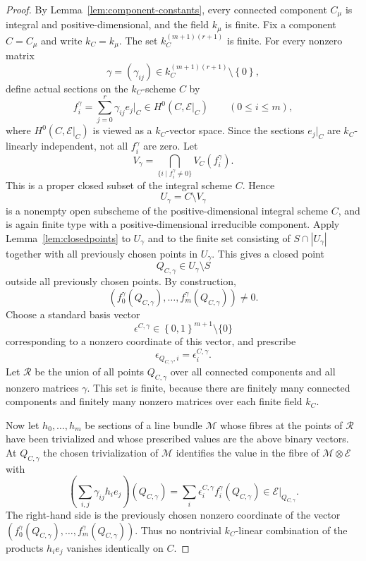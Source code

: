 \documentclass{lms}
\newcommand{\MM}{\mathcal M}
\newcommand{\EE}{\mathcal E}
\newcommand{\set}[1]{\left\{#1\right\}}
\begin{document}
\begin{proof}
By Lemma~\ref{lem:component-constants}, every connected component $C_\mu$ is integral and positive-dimensional, and the field $k_\mu$ is finite.  Fix a component $C=C_\mu$ and write $k_C=k_\mu$.  The set $k_C^{(m+1)(r+1)}$ is finite.  For every nonzero matrix
\[
        \gamma=(\gamma_{ij})\in k_C^{(m+1)(r+1)}\setminus\set{0},
\]
define actual sections on the $k_C$-scheme $C$ by
\[
        f_i^\gamma=\sum_{j=0}^{r}\gamma_{ij}e_j|_C
        \in H^0(C,\EE|_C)
        \qquad(0\le i\le m),
\]
where $H^0(C,\EE|_C)$ is viewed as a $k_C$-vector space.  Since the sections $e_j|_C$ are $k_C$-linearly independent, not all $f_i^\gamma$ are zero.  Let
\[
        V_\gamma=\bigcap_{\{i\mid f_i^\gamma\ne0\}}V_C(f_i^\gamma).
\]
This is a proper closed subset of the integral scheme $C$.  Hence
\[
        U_\gamma=C\setminus V_\gamma
\]
is a nonempty open subscheme of the positive-dimensional integral scheme $C$, and is again finite type with a positive-dimensional irreducible component.  Apply Lemma~\ref{lem:closedpoints} to $U_\gamma$ and to the finite set consisting of $S\cap |U_\gamma|$ together with all previously chosen points in $U_\gamma$.  This gives a closed point
\[
        Q_{C,\gamma}\in U_\gamma\setminus S
\]
outside all previously chosen points.  By construction,
\[
        (f_0^\gamma(Q_{C,\gamma}),\ldots,f_m^\gamma(Q_{C,\gamma}))
        \ne0.
\]
Choose a standard basis vector
\[
        \epsilon^{C,\gamma}\in\set{0,1}^{m+1}\setminus\{0\}
\]
corresponding to a nonzero coordinate of this vector, and prescribe
\[
        \epsilon_{Q_{C,\gamma},i}=\epsilon_i^{C,\gamma}.
\]
Let $\mathcal R$ be the union of all points $Q_{C,\gamma}$ over all connected components and all nonzero matrices $\gamma$.  This set is finite, because there are finitely many connected components and finitely many nonzero matrices over each finite field $k_C$.

Now let $h_0,\ldots,h_m$ be sections of a line bundle $\MM$ whose fibres at the points of $\mathcal R$ have been trivialized and whose prescribed values are the above binary vectors.  At $Q_{C,\gamma}$ the chosen trivialization of $\MM$ identifies the value in the fibre of $\MM\otimes\EE$ with
\[
        \left(\sum_{i,j}\gamma_{ij}h_i e_j\right)(Q_{C,\gamma})
        =\sum_i\epsilon_i^{C,\gamma}f_i^\gamma(Q_{C,\gamma})
        \in \EE|_{Q_{C,\gamma}}.
\]
The right-hand side is the previously chosen nonzero coordinate of the vector $(f_0^\gamma(Q_{C,\gamma}),\ldots,f_m^\gamma(Q_{C,\gamma}))$.  Thus no nontrivial $k_C$-linear combination of the products $h_i e_j$ vanishes identically on $C$.
\end{proof}
\end{document}
